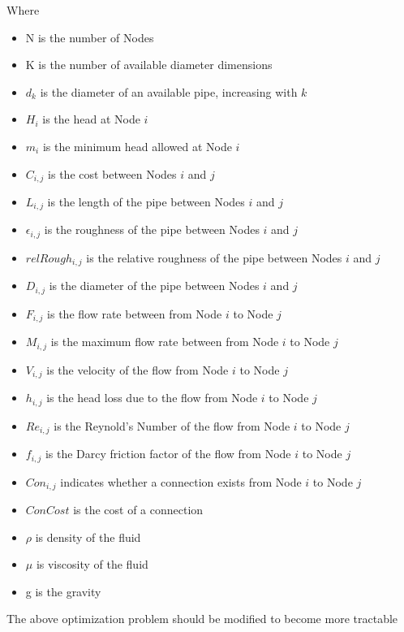 \documentclass[12pt]{article}
\begin{document}
	Where
	\begin{itemize}
		\item N is the number of Nodes
		\item K is the number of available diameter dimensions
		\item $d_{k}$ is the diameter of an available pipe, increasing with $k$
		\item $H_{i}$ is the head at Node $i$
		\item $m_{i}$ is the minimum head allowed at Node $i$
		\item $C_{i,j}$ is the cost between Nodes $i$ and $j$
		\item $L_{i,j}$ is the length of the pipe between Nodes $i$ and $j$
		\item $\epsilon_{i,j}$ is the roughness of the pipe between Nodes $i$ and $j$
		\item $relRough_{i,j}$ is the relative roughness of the pipe between Nodes $i$ and $j$
		\item $D_{i,j}$ is the diameter of the pipe between Nodes $i$ and $j$
		\item $F_{i,j}$ is the flow rate between from Node $i$ to Node $j$
		\item $M_{i,j}$ is the maximum flow rate between from Node $i$ to Node $j$
		\item $V_{i,j}$ is the velocity of the flow from Node $i$ to Node $j$
		\item $h_{i,j}$ is the head loss due to the flow from Node $i$ to Node $j$
		\item $Re_{i,j}$ is the Reynold's Number of the flow from Node $i$ to Node $j$
		\item $f_{i,j}$ is the Darcy friction factor of the flow from Node $i$ to Node $j$
		\item $Con_{i,j}$ indicates whether a connection exists from Node $i$ to Node $j$
		\item $ConCost$ is the cost of a connection
		\item $\rho$ is density of the fluid
		\item $\mu$ is viscosity of the fluid
		\item g is the gravity
	\end{itemize}
	
	The above optimization problem should be modified to become more tractable
	
\end{document}
